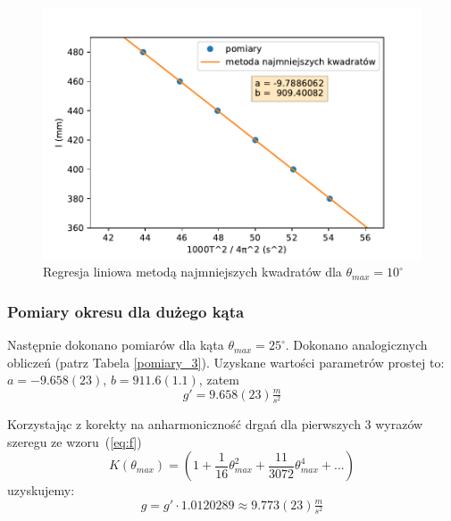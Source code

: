 \documentclass[a4paper]{article}
\newlength{\du}
\begin{document}
\begin{figure}[h!]
\centering
	\includegraphics[scale=0.6]{wykres-3_0.pdf}
\caption{Regresja liniowa metodą najmniejszych kwadratów dla $\theta_{max} = 10^\circ$}
\label{regresja_10}
\end{figure}


\subsubsection{Pomiary okresu dla dużego kąta}

Następnie dokonano pomiarów dla kąta $\theta_{max} = 25^\circ$. 
Dokonano analogicznych obliczeń (patrz Tabela \ref{pomiary_3}).
Uzyskane wartości parametrów prostej to: $a = -9.658(23)$, $b = 911.6(1.1)$,
zatem \[g' = 9.658(23)  \tfrac{m}{s^2}\]

Korzystając z korekty na anharmoniczność drgań dla pierwszych 3 wyrazów szeregu ze wzoru~(\ref{eq:f})
\[ K(\theta_{max}) = \left( 1 + \frac{1}{16}\theta^2_{max} + \frac{11}{3072}\theta^4_{max} + ... \right) \]
uzyskujemy: \[ g = g' \cdot 1.0120289 \approx 9.773(23) \tfrac{m}{s^2}\]
\end{document}
